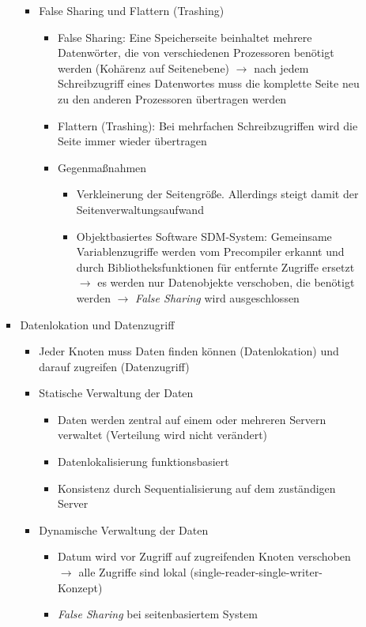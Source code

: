 \begin{itemize}
\begin{itemize}
\begin{itemize}
\begin{itemize}
				\item False Sharing und Flattern (Trashing)
				\begin{itemize}
					\item False Sharing: Eine Speicherseite beinhaltet mehrere Datenwörter, die von verschiedenen Prozessoren benötigt werden (Kohärenz auf Seitenebene) \(\rightarrow\) nach jedem Schreibzugriff eines Datenwortes muss die komplette Seite neu zu den anderen Prozessoren übertragen werden
					\item Flattern (Trashing): Bei mehrfachen Schreibzugriffen wird die Seite immer wieder übertragen
					\item Gegenmaßnahmen
					\begin{itemize}
						\item Verkleinerung der Seitengröße. Allerdings steigt damit der Seitenverwaltungsaufwand
						\item Objektbasiertes Software SDM-System: Gemeinsame Variablenzugriffe werden vom Precompiler erkannt und durch Bibliotheksfunktionen für entfernte Zugriffe ersetzt \(\rightarrow\) es werden nur Datenobjekte verschoben, die benötigt werden \(\rightarrow\) \textit{False Sharing} wird ausgeschlossen
					\end{itemize}
				\end{itemize}
			\end{itemize}
			\item Datenlokation und Datenzugriff
			\begin{itemize}
				\item Jeder Knoten muss Daten finden können (Datenlokation) und darauf zugreifen (Datenzugriff)
				\item Statische Verwaltung der Daten
				\begin{itemize}
					\item Daten werden zentral auf einem oder mehreren Servern verwaltet (Verteilung wird nicht verändert)
					\item Datenlokalisierung funktionsbasiert
					\item Konsistenz durch Sequentialisierung auf dem zuständigen Server
				\end{itemize}
				\item Dynamische Verwaltung der Daten
				\begin{itemize}
					\item Datum wird vor Zugriff auf zugreifenden Knoten verschoben \(\rightarrow\) alle Zugriffe sind lokal (single-reader-single-writer-Konzept)
					\item \textit{False Sharing} bei seitenbasiertem System

\end{itemize}
\end{itemize}
\end{itemize}
\end{itemize}
\end{itemize}
